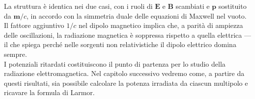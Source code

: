 \vspace{0.5em}

La struttura è identica nei due casi, con i ruoli di $\mathbf{E}$ e $\mathbf{B}$ scambiati e $\mathbf{p}$ sostituito da $\mathbf{m}/c$, in accordo con la simmetria duale delle equazioni di Maxwell nel vuoto. 
Il fattore aggiuntivo $1/c$ nel dipolo magnetico implica che, a parità di ampiezza delle oscillazioni, la radiazione magnetica è soppressa rispetto a quella elettrica — il che spiega perché nelle sorgenti non relativistiche il dipolo elettrico domina sempre.\\

I potenziali ritardati costituiscono il punto di partenza per lo studio della radiazione elettromagnetica. 
Nel capitolo successivo vedremo come, a partire da questi risultati, sia possibile calcolare la potenza irradiata da ciascun multipolo e ricavare la formula di Larmor.